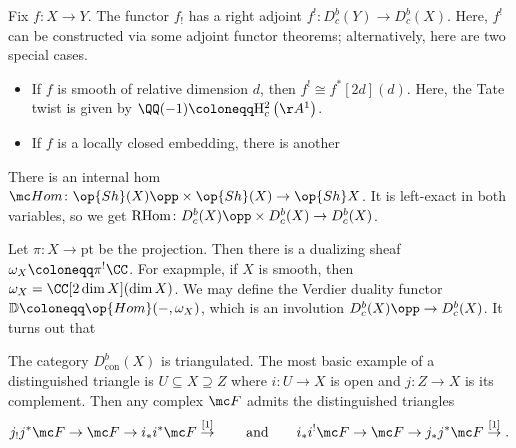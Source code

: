 \documentclass{article}
\begin{document}
\begin{remark}
	Fix $f\colon X\to Y$. The functor $f_!$ has a right adjoint $f^!\colon D_c^b(Y)\to D_c^b(X)$. Here, $f^!$ can be constructed via some adjoint functor theorems; alternatively, here are two special cases.
	\begin{itemize}
		\item If $f$ is smooth of relative dimension $d$, then $f^!\cong f^*[2d](d)$. Here, the Tate twist is given by $\QQ(-1)\coloneqq\mathrm H^2_c\left(\AA^1\right)$.
		\item If $f$ is a locally closed embedding, there is another 
	\end{itemize}
\end{remark}
\begin{remark}
	There is an internal hom $\mc Hom\colon\op{Sh}(X)\opp\times\op{Sh}(X)\to\op{Sh}X$. It is left-exact in both variables, so we get $\mathrm{RHom}\colon D_c^b(X)\opp\times D_c^b(X)\to D_c^b(X)$.
\end{remark}
\begin{remark}
	Let $\pi\colon X\to\mathrm{pt}$ be the projection. Then there is a dualizing sheaf $\omega_X\coloneqq\pi^!\CC$. For exapmple, if $X$ is smooth, then $\omega_X=\CC[2\dim X](\dim X)$. We may define the Verdier duality functor $\mathbb D\coloneqq\op{Hom}(-,\omega_X)$, which is an involution $D_c^b(X)\opp\to D_c^b(X)$. It turns out that 
\end{remark}
\begin{remark}
	The category $D^b_{\mathrm{con}}(X)$ is triangulated. The most basic example of a distinguished triangle is $U\subseteq X\supseteq Z$ where $i\colon U\to X$ is open and $j\colon Z\to X$ is its complement. Then any complex $\mc F$ admits the distinguished triangles
	\[j_!j^*\mc F\to\mc F\to i_*i^*\mc F\stackrel{[1]}\to\qquad\text{and}\qquad i_*i^!\mc F\to\mc F\to j_*j^*\mc F\stackrel{[1]}\to.\]
\end{remark}
\end{document}
